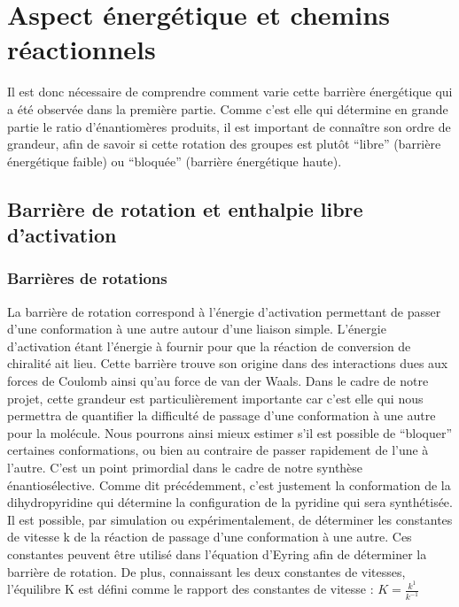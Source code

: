 \documentclass{article}
\begin{document}
\section{Aspect énergétique et chemins réactionnels}

Il est donc nécessaire de comprendre comment varie cette barrière énergétique qui a été observée dans la première partie. Comme c’est elle qui détermine en grande partie le ratio d’énantiomères produits, il est important de connaître son ordre de grandeur, afin de savoir si cette rotation des groupes est plutôt “libre” (barrière énergétique faible) ou “bloquée” (barrière énergétique haute).

\subsection{Barrière de rotation et enthalpie libre d’activation}

\subsubsection{Barrières de rotations}

La barrière de rotation correspond à l'énergie d'activation permettant de passer d'une conformation à une autre autour d'une liaison simple. L’énergie d’activation étant l’énergie à fournir pour que la réaction de conversion de chiralité ait lieu.
\medbreak
Cette barrière trouve son origine dans des interactions dues aux forces de Coulomb ainsi qu’au force de van der Waals. Dans le cadre de notre projet, cette grandeur est particulièrement importante car c’est elle qui nous permettra de quantifier la difficulté de passage d’une conformation à une autre pour la molécule. Nous pourrons ainsi mieux estimer s'il est possible de “bloquer” certaines conformations, ou bien au contraire de passer rapidement de l'une à l'autre. C’est un point primordial dans le cadre de notre synthèse énantiosélective. Comme dit précédemment, c’est justement la conformation de la dihydropyridine qui détermine la configuration de la pyridine qui sera synthétisée.
\medbreak
Il est possible, par simulation ou expérimentalement, de déterminer les constantes de vitesse k de la réaction de passage d’une conformation à une autre. Ces constantes peuvent être utilisé dans l’équation d’Eyring afin de déterminer la barrière de rotation.
De plus, connaissant les deux constantes de vitesses, l'équilibre K est défini comme le rapport des constantes de vitesse : $K=\frac{k^1}{k^{-1}}$
\end{document}
